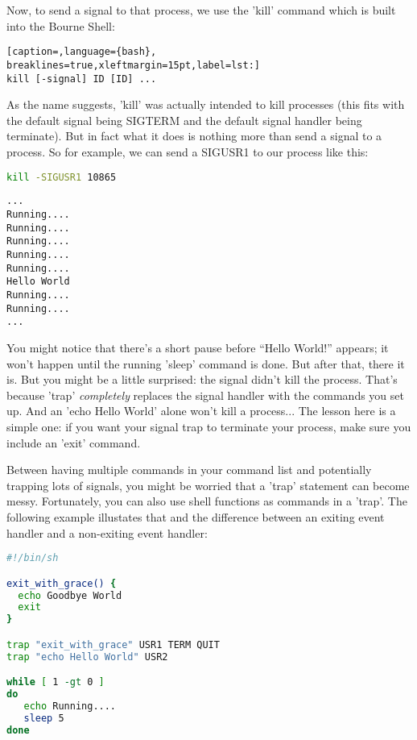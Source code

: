 Now, to send a signal to that process, we use the 'kill' command which is built
into the Bourne Shell: 

\lstset{basicstyle=\scriptsize, numbers=left, captionpos=b, tabsize=4}
\begin{lstlisting}[caption=,language={bash},
breaklines=true,xleftmargin=15pt,label=lst:]
kill [-signal] ID [ID] ...
\end{lstlisting}

As the name suggests, 'kill' was actually intended to kill processes (this fits
with the default signal being SIGTERM and the default signal handler being
terminate). But in fact what it does is nothing more than send a signal to a
process. So for example, we can send a SIGUSR1 to our process like this:

\lstset{basicstyle=\scriptsize, numbers=left, captionpos=b, tabsize=4}
\begin{lstlisting}[caption=Let's trip the trap...,language={bash},
breaklines=true,xleftmargin=15pt,label=lst:Let's trip the trap...]
kill -SIGUSR1 10865
\end{lstlisting}

\scriptsize
\begin{verbatim}
...
Running....
Running....
Running....
Running....
Running....
Hello World
Running....
Running....
...
\end{verbatim}
\normalsize

You might notice that there's a short pause before ``Hello World!'' appears; it
won't happen until the running 'sleep' command is done. But after that, there
it is. But you might be a little surprised: the signal didn't kill the process.
That's because 'trap' \emph{completely} replaces the signal handler with the
commands you set up. And an 'echo Hello World' alone won't kill a process...
The lesson here is a simple one: if you want your signal trap to terminate your
process, make sure you include an 'exit' command.

Between having multiple commands in your command list and potentially trapping
lots of signals, you might be worried that a 'trap' statement can become messy.
Fortunately, you can also use shell functions as commands in a 'trap'. The
following example illustates that and the difference between an exiting event
handler and a non-exiting event handler:

\lstset{basicstyle=\scriptsize, numbers=left, captionpos=b, tabsize=4}
\begin{lstlisting}[caption=A trap with a shell function as a handler,language={bash},
breaklines=true,xleftmargin=15pt,label=lst:A trap with a shell function as a handler]
#!/bin/sh

exit_with_grace() {
  echo Goodbye World
  exit
}

trap "exit_with_grace" USR1 TERM QUIT
trap "echo Hello World" USR2

while [ 1 -gt 0 ]
do
   echo Running....
   sleep 5
done
\end{lstlisting}

